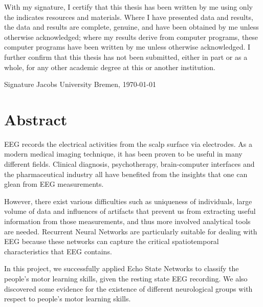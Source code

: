 \documentclass[a4paper,11pt,oneside]{article}
\begin{document}
With my signature, I certify that this thesis has been written by me
using only the indicates resources and materials. Where I have
presented data and results, the data and results are complete,
genuine, and have been obtained by me unless otherwise acknowledged;
where my results derive from computer programs, these computer
programs have been written by me unless otherwise acknowledged. I
further confirm that this thesis has not been submitted, either in
part or as a whole, for any other academic degree at this or another
institution.

\vspace{20mm}

Signature \hfill Jacobs University Bremen, \today

\newpage

\section*{Abstract}
EEG 
 records the electrical activities 
from the scalp surface via electrodes. As a modern medical imaging technique, 
it has been proven to be useful in many different fields. Clinical diagnosis, 
psychotherapy, brain-computer interfaces  and the pharmaceutical industry all have 
benefited from the insights that one can glean from EEG measurements.

However, there exist various difficulties such as uniqueness of individuals, large volume of 
data and influences of artifacts that prevent us from extracting useful information from those 
measurements, and thus more involved analytical tools are needed. Recurrent Neural Networks
are particularly suitable for dealing with EEG because these networks can capture the critical spatiotemporal characteristics
that EEG contains.

In this project, we successfully applied
 Echo State Networks  to classify 
 the  people's motor learning skills,  given the resting state EEG recording. We also discovered some evidence for the existence of different neurological groups with respect to people's motor learning skills. 

\newpage
\tableofcontents

\clearpage
{}

\end{document}
